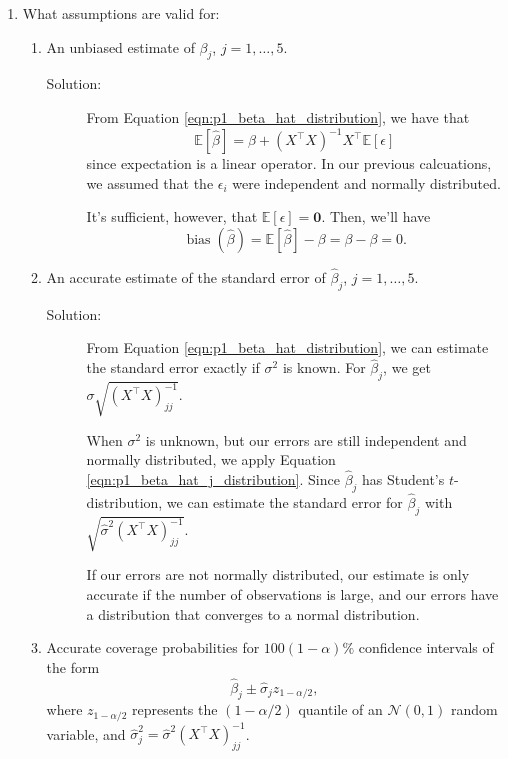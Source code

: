 \documentclass[letterpaper,11pt]{article}
\begin{document}
\begin{enumerate}
\begin{enumerate}
  \item What assumptions are valid for:
    \begin{enumerate}
    \item An unbiased estimate of $\beta_j$, $j = 1,\ldots,5$.
      \begin{description}
      \item[Solution:] From Equation \ref{eqn:p1_beta_hat_distribution}, we have
        that
        \begin{equation}
          \mathbb{E}\left[\hat{\beta}\right]
          =
          \beta + \left(X^\intercal X\right)^{-1}X^\intercal \mathbb{E}\left[\epsilon\right]
        \end{equation}
        since expectation is a linear operator. In our previous calcuations, we
        assumed that the $\epsilon_i$ were independent and normally distributed.

        It's sufficient, however, that
        $\boxed{\mathbb{E}\left[\epsilon\right] = \mathbf{0}.}$ Then, we'll have
        \begin{equation*}
          \operatorname{bias}\left(\hat{\beta}\right) =
          \mathbb{E}\left[\hat{\beta}\right] - \beta
          = \beta - \beta = 0.
        \end{equation*}
      \end{description}
    \item An accurate estimate of the standard error of $\hat{\beta}_j$,
      $j = 1,\ldots,5$.

      \begin{description}
      \item[Solution:] From Equation \ref{eqn:p1_beta_hat_distribution}, we can
        estimate the standard error exactly if $\sigma^2$ is known. For
        $\hat{\beta}_j$, we get $\sigma\sqrt{\left(X^\intercal X\right)_{jj}^{-1}}$.

        When $\sigma^2$ is unknown, but our errors are still independent and
        normally distributed, we apply Equation
        \ref{eqn:p1_beta_hat_j_distribution}. Since $\hat{\beta}_j$ has Student's
        $t$-distribution, we can estimate the standard error for $\hat{\beta}_j$
        with $\sqrt{\hat{\sigma}^2\left(X^\intercal X\right)_{jj}^{-1}}$.

        If our errors are not normally distributed, our estimate is only
        accurate if the number of observations is large, and our errors have a
        distribution that converges to a normal distribution.
      \end{description}
    \item Accurate coverage probabilities for $100\left(1 - \alpha\right)\%$
      confidence intervals of the form
      \begin{equation}
        \hat{\beta}_j \pm \hat{\sigma}_jz_{1-\alpha/2},
      \end{equation}
      where $z_{1-\alpha/2}$ represents the $\left(1-\alpha/2\right)$ quantile
      of an $\mathcal{N}\left(0, 1\right)$ random variable, and
      $\hat{\sigma}_j^2 = \hat{\sigma}^2\left(X^\intercal X\right)_{jj}^{-1}$.


\end{enumerate}
\end{enumerate}
\end{enumerate}
\end{document}
